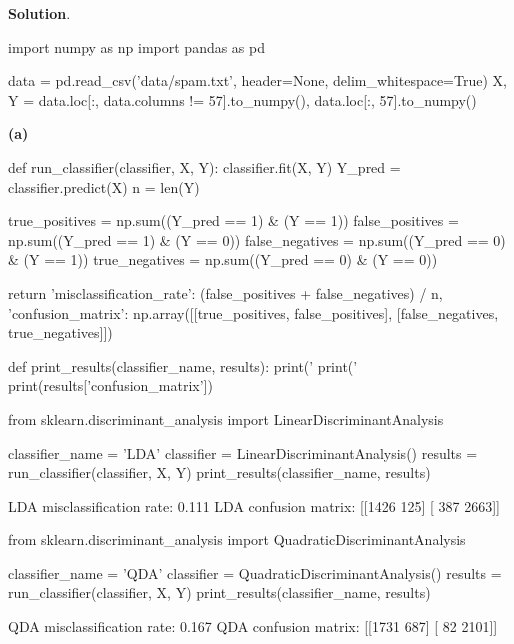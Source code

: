 \textbf{Solution}.

\begin{python}
import numpy as np
import pandas as pd

data = pd.read_csv('data/spam.txt', header=None, delim_whitespace=True)
X, Y = data.loc[:, data.columns != 57].to_numpy(), data.loc[:, 57].to_numpy()
\end{python}

\textbf{(a)}

\begin{python}
def run_classifier(classifier, X, Y):
    classifier.fit(X, Y)
    Y_pred = classifier.predict(X)
    n = len(Y)
    
    true_positives = np.sum((Y_pred == 1) & (Y == 1))
    false_positives = np.sum((Y_pred == 1) & (Y == 0))
    false_negatives = np.sum((Y_pred == 0) & (Y == 1))
    true_negatives = np.sum((Y_pred == 0) & (Y == 0))

    return {
        'misclassification_rate': (false_positives + false_negatives) / n,
        'confusion_matrix': np.array([[true_positives, false_positives], [false_negatives, true_negatives]])
    }

def print_results(classifier_name, results):
    print('%
    print('%
    print(results['confusion_matrix'])
\end{python}

\begin{python}
from sklearn.discriminant_analysis import LinearDiscriminantAnalysis

classifier_name = 'LDA'
classifier = LinearDiscriminantAnalysis()
results = run_classifier(classifier, X, Y)
print_results(classifier_name, results)
\end{python}

\begin{console}
LDA misclassification rate: 0.111
LDA confusion matrix:
[[1426  125]
 [ 387 2663]]
\end{console}

\begin{python}
from sklearn.discriminant_analysis import QuadraticDiscriminantAnalysis

classifier_name = 'QDA'
classifier = QuadraticDiscriminantAnalysis()
results = run_classifier(classifier, X, Y)
print_results(classifier_name, results)
\end{python}

\begin{console}
QDA misclassification rate: 0.167
QDA confusion matrix:
[[1731  687]
 [  82 2101]]
\end{console}

